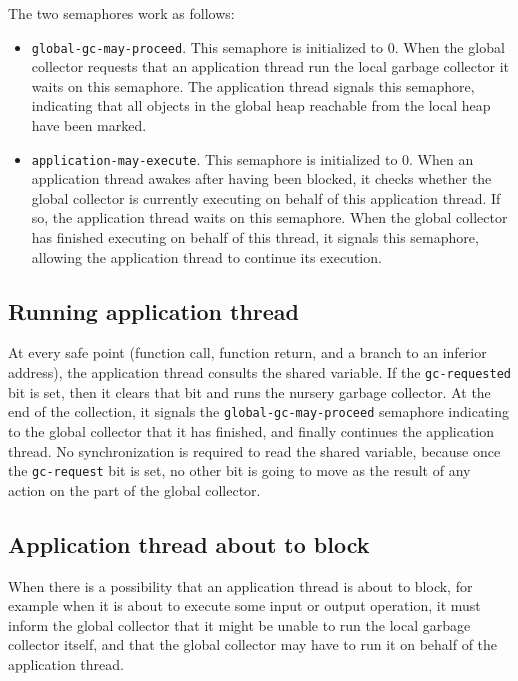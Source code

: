 The two semaphores work as follows:

\begin{itemize}
\item \texttt{global-gc-may-proceed}.  This semaphore is initialized to
  $0$.  When the global collector requests that an application thread
  run the local garbage collector it waits on this semaphore.  The
  application thread signals this semaphore, indicating that all
  objects in the global heap reachable from the local heap have been
  marked.
\item \texttt{application-may-execute}.  This semaphore is initialized
  to $0$.  When an application thread awakes after having been
  blocked, it checks whether the global collector is currently
  executing on behalf of this application thread.  If so, the
  application thread waits on this semaphore.  When the global
  collector has finished executing on behalf of this thread, it
  signals this semaphore, allowing the application thread to continue
  its execution.
\end{itemize}

\subsection{Running application thread}

At every safe point (function call, function return, and a branch to
an inferior address), the application thread consults the shared
variable.  If the \texttt{gc-requested} bit is set, then it clears
that bit and runs the nursery garbage collector.  At the end of the
collection, it signals the \texttt{global-gc-may-proceed} semaphore
indicating to the global collector that it has finished, and finally
continues the application thread.  No synchronization is required to
read the shared variable, because once the \texttt{gc-request} bit is
set, no other bit is going to move as the result of any action on the
part of the global collector.

\subsection{Application thread about to block}

When there is a possibility that an application thread is about to
block, for example when it is about to execute some input or output
operation,  it must inform the global collector that it might be
unable to run the local garbage collector itself, and that the global
collector may have to run it on behalf of the application thread.

